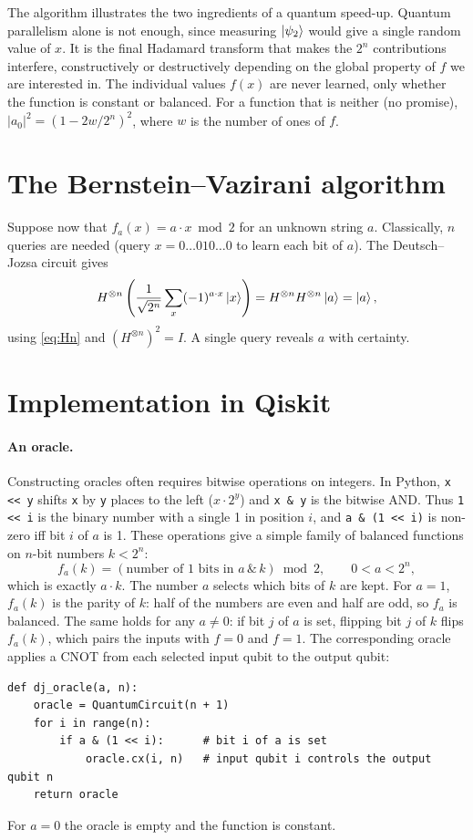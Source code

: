 The algorithm illustrates the two ingredients of a quantum speed-up. Quantum parallelism alone is not enough, since measuring $\left|\psi_2\right\rangle$ would give a single random value of $x$. It is the final
Hadamard transform that makes the $2^n$ contributions interfere, constructively or destructively depending on the global property of $f$ we are interested in. The individual values $f(x)$ are never
learned, only whether the function is constant or balanced. For a function that is neither (no promise), $|a_0|^2=(1-2w/2^n)^2$, where $w$ is the number of ones of $f$.

\section{The Bernstein--Vazirani algorithm}
Suppose now that $f_a(x)=a\cdot x\bmod2$ for an unknown string $a$. Classically, $n$ queries are needed (query $x=0\dots010\dots0$ to learn each bit of $a$). The Deutsch--Jozsa circuit gives
\begin{equation}
  H^{\otimes n}\left(\frac1{\sqrt{2^n}}\sum_x(-1)^{a\cdot x}\left|x\right\rangle\right)=H^{\otimes n}H^{\otimes n}\left|a\right\rangle=\left|a\right\rangle,
\end{equation}
using \cref{eq:Hn} and $(H^{\otimes n})^2=I$. A single query reveals $a$ with certainty.

\section{Implementation in Qiskit}
\paragraph{An oracle.} Constructing oracles often requires bitwise operations on integers. In Python, \texttt{x << y} shifts \texttt{x} by \texttt{y} places to the left ($x\cdot2^y$) and \texttt{x \& y}
is the bitwise AND. Thus \texttt{1 << i} is the binary number with a single 1 in position $i$, and \texttt{a \& (1 << i)} is non-zero iff bit $i$ of $a$ is 1. These operations give a simple family of
balanced functions on $n$-bit numbers $k<2^n$:
\begin{equation}
  f_a(k)=\left(\text{number of 1 bits in }a\,\&\,k\right)\bmod2,\qquad0<a<2^n,
\end{equation}
which is exactly $a\cdot k$. The number $a$ selects which bits of $k$ are kept. For $a=1$, $f_a(k)$ is the parity of $k$: half of the numbers are even and half are odd, so $f_a$ is balanced. The same holds
for any $a\neq0$: if bit $j$ of $a$ is set, flipping bit $j$ of $k$ flips $f_a(k)$, which pairs the inputs with $f=0$ and $f=1$. The corresponding oracle applies a CNOT from each selected input qubit to the output qubit:
\begin{lstlisting}
def dj_oracle(a, n):
    oracle = QuantumCircuit(n + 1)
    for i in range(n):
        if a & (1 << i):      # bit i of a is set
            oracle.cx(i, n)   # input qubit i controls the output qubit n
    return oracle
\end{lstlisting}
For $a=0$ the oracle is empty and the function is constant.

